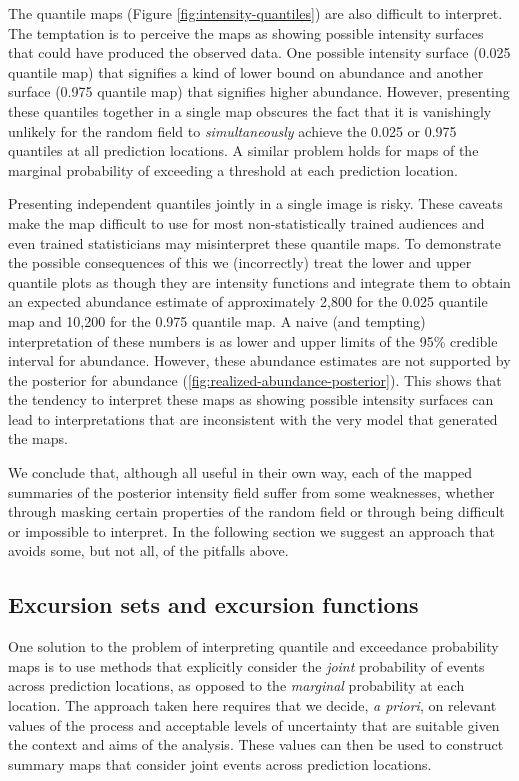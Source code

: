 \documentclass{statsoc}
\begin{document}
The quantile maps (Figure \ref{fig:intensity-quantiles}) are also difficult to interpret. The temptation is to perceive the maps as showing possible intensity surfaces that could have produced the observed data. One possible intensity surface (0.025 quantile map) that signifies a kind of lower bound on abundance and another surface (0.975 quantile map) that signifies higher abundance.  However, presenting these quantiles together in a single map obscures the fact that it is vanishingly unlikely for the random field to \textit{simultaneously} achieve the 0.025 or 0.975 quantiles at all prediction locations.  A similar problem holds for maps of the marginal probability of exceeding a threshold at each prediction location.  

Presenting independent quantiles jointly in a single image is risky.  These caveats make the map difficult to use for most non-statistically trained audiences and even trained statisticians may misinterpret these quantile maps.  To demonstrate the possible consequences of this we (incorrectly) treat the lower and upper quantile plots as though they are intensity functions and integrate them to obtain an expected abundance estimate of approximately 2,800 for the 0.025 quantile map and 10,200 for the 0.975 quantile map.  A naive (and tempting) interpretation of these numbers is as lower and upper limits of the 95\% credible interval for abundance. However, these abundance estimates are not supported by the posterior for abundance (\autoref{fig:realized-abundance-posterior}).  This shows that the tendency to interpret these maps as showing possible intensity surfaces can lead to interpretations that are inconsistent with the very model that generated the maps.

We conclude that, although all useful in their own way, each of the mapped summaries of the posterior intensity field suffer from some weaknesses, whether through masking certain properties of the random field or through being difficult or impossible to interpret. In the following section we suggest an approach that avoids some, but not all, of the pitfalls above.

\subsection{Excursion sets and excursion functions}

One solution to the problem of interpreting quantile and exceedance probability maps is to use methods that explicitly consider the \textit{joint} probability of events across prediction locations, as opposed to the \textit{marginal} probability at each location. The approach taken here requires that we decide, \emph{a priori}, on relevant values of the process and acceptable levels of uncertainty that are suitable given the context and aims of the analysis.  These values can then be used to construct summary maps that consider joint events across prediction locations.  
\end{document}
